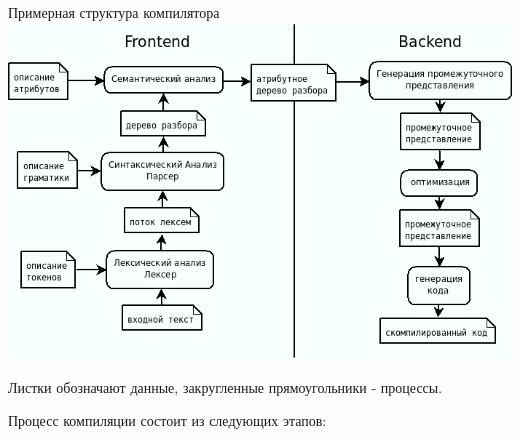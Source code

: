 \documentclass[a4paper,12pt]{article}
\begin{document}
\begin{center}
 Примерная структура компилятора
 \includegraphics[scale=0.6]{img/compiler2.png}
\end{center}
Листки обозначают данные, закругленные прямоугольники - процессы.

Процесс компиляции состоит из следующих этапов:
\end{document}

